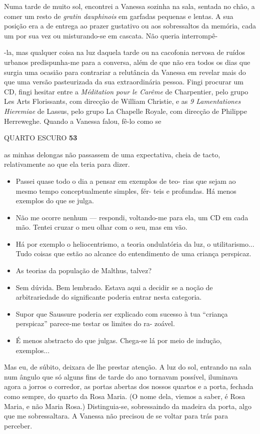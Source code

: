 Numa tarde de muito sol, encontrei a Vanessa sozinha na sala, sentada no
chão, a comer um resto de \emph{gratin dauphinois }em garfadas pequenas
e lentas. A sua posição era a de entrega ao prazer gustativo ou aos
sobressaltos da memória, cada um por sua vez ou misturando-se em
cascata. Não queria interrompê-

-la, mas qualquer coisa na luz daquela tarde ou na cacofonia nervosa de
ruídos urbanos predispunha-me para a conversa, além de que não era todos
os dias que surgia uma ocasião para contrariar a relutância da Vanessa
em revelar mais do que uma versão pasteurizada da sua extraordinária
pessoa. Fingi procurar um CD, fingi hesitar entre a \emph{Méditation
pour le Carême }de Charpentier, pelo grupo Les Arts Florissants, com
direcção de William Christie, e as \emph{9 Lamentationes Hieremiae }de
Lassus, pelo grupo La Chapelle Royale, com direcção de Philippe
Herreweghe. Quando a Vanessa falou, fê-lo como se

QUARTO ESCURO \textbf{53}

as minhas delongas não passassem de uma expectativa, cheia de tacto,
relativamente ao que ela teria para dizer.

\begin{itemize}
\tightlist
\item
  Passei quase todo o dia a pensar em exemplos de teo- rias que sejam ao
  mesmo tempo conceptualmente simples, fér- teis e profundas. Há menos
  exemplos do que se julga.
\item
  Não me ocorre nenhum --- respondi, voltando-me para ela, um CD em cada
  mão. Tentei cruzar o meu olhar com o seu, mas em vão.
\item
  Há por exemplo o heliocentrismo, a teoria ondulatória da luz, o
  utilitarismo... Tudo coisas que estão ao alcance do entendimento de
  uma criança perspicaz.
\item
  As teorias da população de Malthus, talvez?
\item
  Sem dúvida. Bem lembrado. Estava aqui a decidir se a noção de
  arbitrariedade do significante poderia entrar nesta categoria.
\item
  Supor que Saussure poderia ser explicado com sucesso à tua ``criança
  perspicaz'' parece-me testar os limites do ra- zoável.
\item
  É menos abstracto do que julgas. Chega-se lá por meio de indução,
  exemplos...
\end{itemize}

Mas eu, de súbito, deixara de lhe prestar atenção. A luz do sol,
entrando na sala num ângulo que só alguns fins de tarde do ano tornavam
possível, iluminava agora a jorros o corredor, as portas abertas dos
nossos quartos e a porta, fechada como sempre, do quarto da Rosa Maria.
(O nome dela, viemos a saber, é Rosa Maria, e não Maria Rosa.)
Distinguia-se, sobressaindo da madeira da porta, algo que me
sobressaltara. A Vanessa não precisou de se voltar para trás para
perceber.

